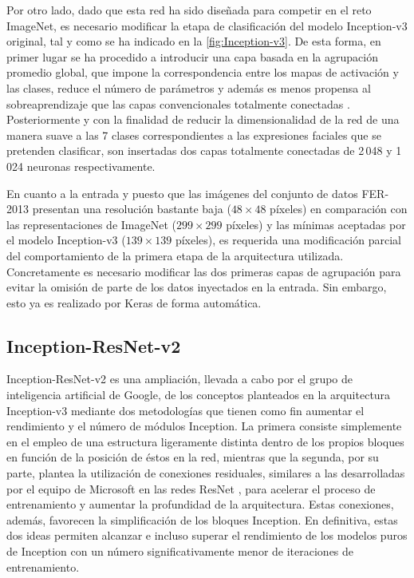 Por otro lado, dado que esta red ha sido diseñada para competir en el reto ImageNet, es necesario modificar la etapa de clasificación del modelo Inception-v3 original, tal y como se ha indicado en la \autoref{fig:Inception-v3}. De esta forma, en primer lugar se ha procedido a introducir una capa basada en la agrupación promedio global, que impone la correspondencia entre los mapas de activación y las clases, reduce el número de parámetros y además es menos propensa al sobreaprendizaje que las capas convencionales totalmente conectadas \cite{NetworkInNetwork}. Posteriormente y con la finalidad de reducir la dimensionalidad de la red de una manera suave a las 7 clases correspondientes a las expresiones faciales que se pretenden clasificar, son insertadas dos capas totalmente conectadas de 2\,048 y 1\,024 neuronas respectivamente.

En cuanto a la entrada y puesto que las imágenes del conjunto de datos FER-2013 presentan una resolución bastante baja ($48\times 48$ píxeles) en comparación con las representaciones de ImageNet ($299\times 299$ píxeles) y las mínimas aceptadas por el modelo Inception-v3 ($139\times 139$ píxeles), es requerida una modificación parcial del comportamiento de la primera etapa de la arquitectura utilizada. Concretamente es necesario modificar las dos primeras capas de agrupación para evitar la omisión de parte de los datos inyectados en la entrada. Sin embargo, esto ya es realizado por Keras de forma automática.

\subsection{Inception-ResNet-v2}

Inception-ResNet-v2 es una ampliación, llevada a cabo por el grupo de inteligencia artificial de Google, de los conceptos planteados en la arquitectura Inception-v3 mediante dos metodologías que tienen como fin aumentar el rendimiento y el número de módulos Inception. La primera consiste simplemente en el empleo de una estructura ligeramente distinta dentro de los propios bloques en función de la posición de éstos en la red, mientras que la segunda, por su parte, plantea la utilización de conexiones residuales, similares a las desarrolladas por el equipo de Microsoft en las redes ResNet \cite{ResNet}, para acelerar el proceso de entrenamiento y aumentar la profundidad de la arquitectura. Estas conexiones, además, favorecen la simplificación de los bloques Inception. En definitiva, estas dos ideas permiten alcanzar e incluso superar el rendimiento de los modelos puros de Inception con un número significativamente menor de iteraciones de entrenamiento.

